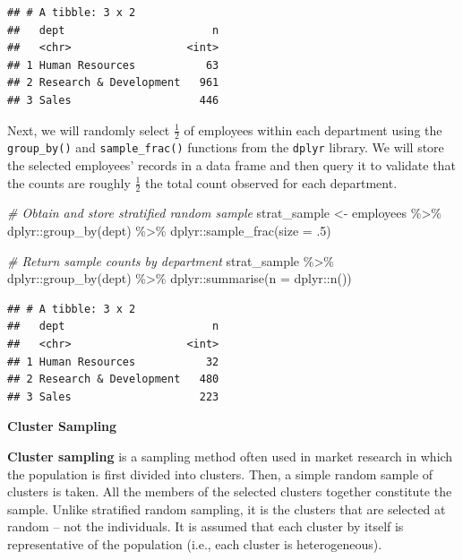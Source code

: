 \documentclass[
]{book}
\newenvironment{Shaded}{\begin{snugshade}}{\end{snugshade}}
\newcommand{\AttributeTok}[1]{\textcolor[rgb]{0.77,0.63,0.00}{#1}}
\newcommand{\CommentTok}[1]{\textcolor[rgb]{0.56,0.35,0.01}{\textit{#1}}}
\newcommand{\DecValTok}[1]{\textcolor[rgb]{0.00,0.00,0.81}{#1}}
\newcommand{\FunctionTok}[1]{\textcolor[rgb]{0.00,0.00,0.00}{#1}}
\newcommand{\NormalTok}[1]{#1}
\newcommand{\OtherTok}[1]{\textcolor[rgb]{0.56,0.35,0.01}{#1}}
\newcommand{\SpecialCharTok}[1]{\textcolor[rgb]{0.00,0.00,0.00}{#1}}
\begin{document}
\begin{verbatim}
## # A tibble: 3 x 2
##   dept                       n
##   <chr>                  <int>
## 1 Human Resources           63
## 2 Research & Development   961
## 3 Sales                    446
\end{verbatim}

Next, we will randomly select \(\frac{1}{2}\) of employees within each department using the \texttt{group\_by()} and \texttt{sample\_frac()} functions from the \texttt{dplyr} library. We will store the selected employees' records in a data frame and then query it to validate that the counts are roughly \(\frac{1}{2}\) the total count observed for each department.

\begin{Shaded}
\begin{Highlighting}[]
\CommentTok{\# Obtain and store stratified random sample}
\NormalTok{strat\_sample }\OtherTok{\textless{}{-}}\NormalTok{ employees }\SpecialCharTok{\%\textgreater{}\%}
\NormalTok{                dplyr}\SpecialCharTok{::}\FunctionTok{group\_by}\NormalTok{(dept) }\SpecialCharTok{\%\textgreater{}\%}
\NormalTok{                dplyr}\SpecialCharTok{::}\FunctionTok{sample\_frac}\NormalTok{(}\AttributeTok{size =}\NormalTok{ .}\DecValTok{5}\NormalTok{)}

\CommentTok{\# Return sample counts by department}
\NormalTok{strat\_sample }\SpecialCharTok{\%\textgreater{}\%}
\NormalTok{dplyr}\SpecialCharTok{::}\FunctionTok{group\_by}\NormalTok{(dept) }\SpecialCharTok{\%\textgreater{}\%}
\NormalTok{dplyr}\SpecialCharTok{::}\FunctionTok{summarise}\NormalTok{(}\AttributeTok{n =}\NormalTok{ dplyr}\SpecialCharTok{::}\FunctionTok{n}\NormalTok{())}
\end{Highlighting}
\end{Shaded}

\begin{verbatim}
## # A tibble: 3 x 2
##   dept                       n
##   <chr>                  <int>
## 1 Human Resources           32
## 2 Research & Development   480
## 3 Sales                    223
\end{verbatim}

\textbf{Cluster Sampling}

\textbf{Cluster sampling} is a sampling method often used in market research in which the population is first divided into clusters. Then, a simple random sample of clusters is taken. All the members of the selected clusters together constitute the sample. Unlike stratified random sampling, it is the clusters that are selected at random -- not the individuals. It is assumed that each cluster by itself is representative of the population (i.e., each cluster is heterogeneous).
\end{document}

